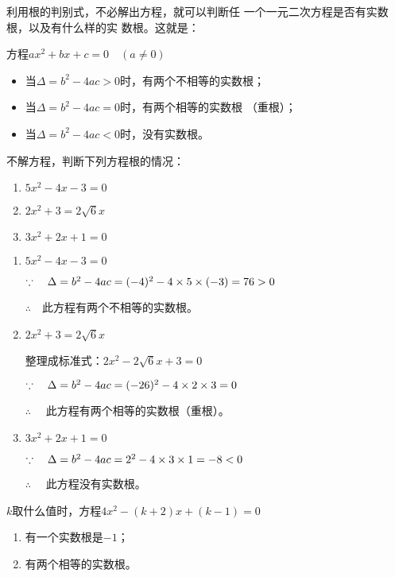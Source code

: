 利用根的判别式，不必解出方程，就可以判断任
一个一元二次方程是否有实数根，以及有什么样的实
数根。这就是：
\begin{blk}{}
    方程$ax^2+bx+c=0\quad (a\ne 0)$
    \begin{itemize}
        \item 当$\Delta =b^2-4ac>0$时，有两个不相等的实数根；
        \item 当$\Delta=b^2-4ac=0$时，有两个相等的实数根
        （重根）；
        \item 当$\Delta=b^2-4ac<0$时，没有实数根。
    \end{itemize}
\end{blk}

\begin{example}
    不解方程，判断下列方程根的情况：
    \begin{enumerate}
        \item $5x^2-4x-3=0$
        \item $2x^2+3=2\sqrt{6}x$
        \item $3x^2+2x+1=0$
    \end{enumerate}
\end{example}

\begin{solution}
\begin{enumerate}
    \item $5x^2-4x-3=0$
    
    $\because\quad \Delta =b^2-4ac=(-4)^2-4\times5 \times(-3)=76>0$

   $\therefore\quad $此方程有两个不相等的实数根。
   \item $2x^2+3=2\sqrt{6}x$
   
    整理成标准式：$2x^2-2\sqrt{6}x+3=0$

    $\because\quad \Delta=b^2-4ac=(-26)^2-4\times2\times3=0$

 $\therefore\quad $   此方程有两个相等的实数根（重根）。

\item $3x^2+2x+1=0$
    
$\because\quad \Delta=b^2-4ac=2^2-4\times3\times1=-8<0$

$\therefore\quad $   此方程没有实数根。
\end{enumerate}
\end{solution}

\begin{example}
    $k$取什么值时，方程$4x^2-(k+2)x+(k-1)=0$
    \begin{enumerate}
        \item 有一个实数根是$-1$；
        \item 有两个相等的实数根。
    \end{enumerate}
\end{example}

